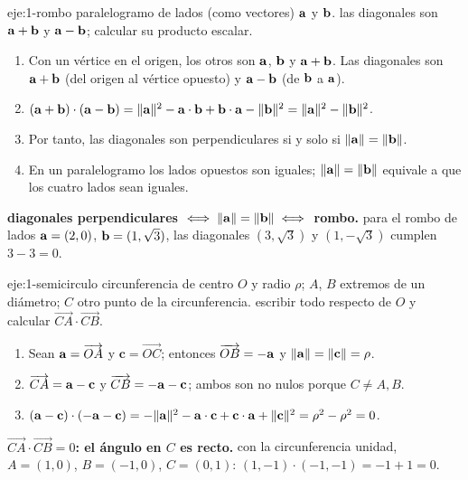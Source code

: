 \begin{solucion}{eje:1-rombo}
\datos paralelogramo de lados (como vectores) $\mathbf{a}$ y $\mathbf{b}$.
\planteamiento las diagonales son $\mathbf{a}+\mathbf{b}$ y $\mathbf{a}-\mathbf{b}$; calcular su producto escalar.
\pasos
\begin{enumerate}[label=\arabic*.]
  \item Con un vértice en el origen, los otros son $\mathbf{a}$, $\mathbf{b}$ y $\mathbf{a}+\mathbf{b}$. Las diagonales son $\mathbf{a}+\mathbf{b}$ (del origen al vértice opuesto) y $\mathbf{a}-\mathbf{b}$ (de $\mathbf{b}$ a $\mathbf{a}$).
  \item $(\mathbf{a}+\mathbf{b})\cdot(\mathbf{a}-\mathbf{b})=\lVert\mathbf{a}\rVert^2-\mathbf{a}\cdot\mathbf{b}+\mathbf{b}\cdot\mathbf{a}-\lVert\mathbf{b}\rVert^2=\lVert\mathbf{a}\rVert^2-\lVert\mathbf{b}\rVert^2$.
  \item Por tanto, las diagonales son perpendiculares si y solo si $\lVert\mathbf{a}\rVert=\lVert\mathbf{b}\rVert$.
  \item En un paralelogramo los lados opuestos son iguales; $\lVert\mathbf{a}\rVert=\lVert\mathbf{b}\rVert$ equivale a que los cuatro lados sean iguales.
\end{enumerate}
\resultado \textbf{diagonales perpendiculares $\iff\lVert\mathbf{a}\rVert=\lVert\mathbf{b}\rVert\iff$ rombo.}
\comprobacion para el rombo de lados $\mathbf{a}=(2,0)$, $\mathbf{b}=(1,\sqrt3)$, las diagonales $(3,\sqrt3)$ y $(1,-\sqrt3)$ cumplen $3-3=0$.
\end{solucion}

\begin{solucion}{eje:1-semicirculo}
\datos circunferencia de centro $O$ y radio $\rho$; $A$, $B$ extremos de un diámetro; $C$ otro punto de la circunferencia.
\planteamiento escribir todo respecto de $O$ y calcular $\overrightarrow{CA}\cdot\overrightarrow{CB}$.
\pasos
\begin{enumerate}[label=\arabic*.]
  \item Sean $\mathbf{a}=\overrightarrow{OA}$ y $\mathbf c=\overrightarrow{OC}$; entonces $\overrightarrow{OB}=-\mathbf{a}$ y $\lVert\mathbf{a}\rVert=\lVert\mathbf c\rVert=\rho$.
  \item $\overrightarrow{CA}=\mathbf{a}-\mathbf c$ y $\overrightarrow{CB}=-\mathbf{a}-\mathbf c$; ambos son no nulos porque $C\neq A,B$.
  \item $(\mathbf{a}-\mathbf c)\cdot(-\mathbf{a}-\mathbf c)=-\lVert\mathbf{a}\rVert^2-\mathbf{a}\cdot\mathbf c+\mathbf c\cdot\mathbf{a}+\lVert\mathbf c\rVert^2=\rho^2-\rho^2=0$.
\end{enumerate}
\resultado \textbf{$\overrightarrow{CA}\cdot\overrightarrow{CB}=0$: el ángulo en $C$ es recto.}
\comprobacion con la circunferencia unidad, $A=(1,0)$, $B=(-1,0)$, $C=(0,1)$: $(1,-1)\cdot(-1,-1)=-1+1=0$.
\end{solucion}

